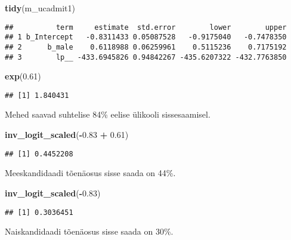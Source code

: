\documentclass[]{article}
\newenvironment{Shaded}{\begin{snugshade}}{\end{snugshade}}
\newcommand{\KeywordTok}[1]{\textcolor[rgb]{0.13,0.29,0.53}{\textbf{#1}}}
\newcommand{\FloatTok}[1]{\textcolor[rgb]{0.00,0.00,0.81}{#1}}
\newcommand{\StringTok}[1]{\textcolor[rgb]{0.31,0.60,0.02}{#1}}
\newcommand{\OperatorTok}[1]{\textcolor[rgb]{0.81,0.36,0.00}{\textbf{#1}}}
\newcommand{\NormalTok}[1]{#1}
\begin{document}
\begin{Shaded}
\begin{Highlighting}[]
\KeywordTok{tidy}\NormalTok{(m_ucadmit1)}
\end{Highlighting}
\end{Shaded}

\begin{verbatim}
##          term     estimate  std.error        lower        upper
## 1 b_Intercept   -0.8311433 0.05087528   -0.9175040   -0.7478350
## 2      b_male    0.6118988 0.06259961    0.5115236    0.7175192
## 3        lp__ -433.6945826 0.94842267 -435.6207322 -432.7763850
\end{verbatim}

\begin{Shaded}
\begin{Highlighting}[]
\KeywordTok{exp}\NormalTok{(}\FloatTok{0.61}\NormalTok{)}
\end{Highlighting}
\end{Shaded}

\begin{verbatim}
## [1] 1.840431
\end{verbatim}

Mehed saavad suhtelise 84\% eelise ülikooli sissesaamisel.

\begin{Shaded}
\begin{Highlighting}[]
\KeywordTok{inv_logit_scaled}\NormalTok{(}\OperatorTok{-}\FloatTok{0.83} \OperatorTok{+}\StringTok{ }\FloatTok{0.61}\NormalTok{)}
\end{Highlighting}
\end{Shaded}

\begin{verbatim}
## [1] 0.4452208
\end{verbatim}

Meeskandidaadi tõenäosus sisse saada on 44\%.

\begin{Shaded}
\begin{Highlighting}[]
\KeywordTok{inv_logit_scaled}\NormalTok{(}\OperatorTok{-}\FloatTok{0.83}\NormalTok{)}
\end{Highlighting}
\end{Shaded}

\begin{verbatim}
## [1] 0.3036451
\end{verbatim}

Naiskandidaadi tõenäosus sisse saada on 30\%.
\end{document}
